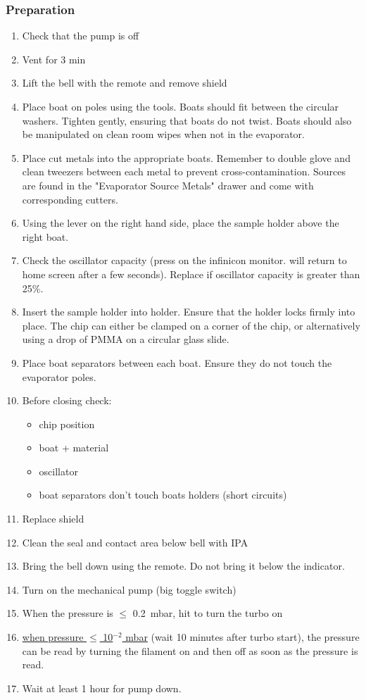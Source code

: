 \subsubsection{Preparation}
\begin{enumerate}
\item Check that the pump is off
\item Vent for 3 min
\item Lift the bell with the remote and remove shield
\item Place boat on poles using the tools. Boats should fit between the circular washers. Tighten gently, ensuring that
boats do not twist. Boats should also be manipulated on clean room wipes when not in the evaporator.
\item Place cut metals into the appropriate boats. Remember to double glove and clean tweezers between each metal
to prevent cross-contamination. Sources are found in the "Evaporator Source Metals" drawer and come with corresponding cutters.
\item Using the lever on the right hand side, place the sample holder above the right boat.
\item Check the oscillator capacity (press  on the infinicon monitor. will return to home screen after a few seconds). Replace if
oscillator capacity is greater than 25\%.
\item Insert the sample holder into holder. Ensure that the holder locks firmly into place. The chip can either be clamped on a corner of the chip,
      or alternatively using a drop of PMMA on a circular glass slide.
\item Place boat separators between each boat. Ensure they do not touch the evaporator poles.
\item Before closing check:
\begin{itemize}[nolistsep,noitemsep]
  \item chip position
  \item boat + material
  \item oscillator
  \item boat separators don't touch boats holders (short circuits)
\end{itemize}
\item Replace shield
\item Clean the seal and contact area below bell with IPA
\item Bring the bell down using the remote. Do not bring it below the indicator.
\item Turn on the mechanical pump (big toggle switch)
\item When the pressure is $\leq$ \SI{0.2}{\milli\bar}, hit  to turn the turbo on\\
\item \underline{when pressure $\leq$ 10$^{-2}$ mbar} (wait 10 minutes after turbo start), the pressure can be read by turning the filament on and then off as soon as the pressure is read.\\
\item Wait at least 1 hour for pump down.
\end{enumerate}

